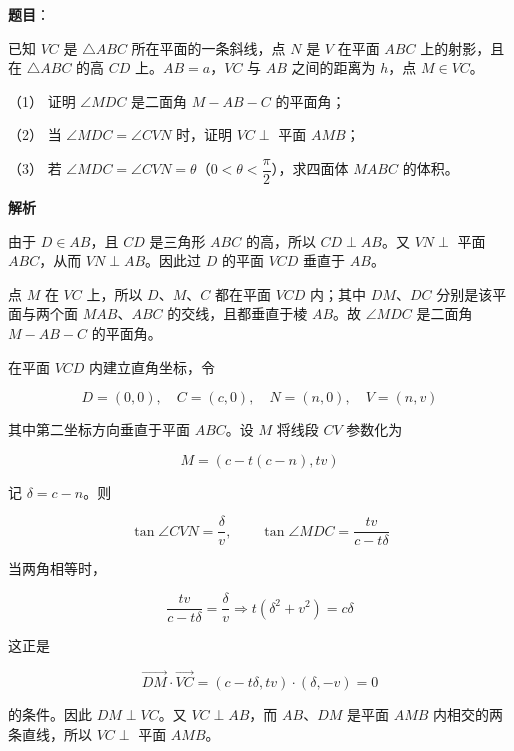 \begin{answer}

\textbf{题目}：

已知 $V C$ 是 $\triangle ABC$ 所在平面的一条斜线，点 $N$ 是 $V$ 在平面 $ABC$ 上的射影，且在 $\triangle ABC$ 的高 $CD$ 上。$AB=a$，$VC$ 与 $AB$ 之间的距离为 $h$，点 $M\in VC$。
\nopagebreak[4]
\begin{center}\end{center}
\nopagebreak[4]
（1） 证明 $\angle MDC$ 是二面角 $M-AB-C$ 的平面角；

（2） 当 $\angle MDC=\angle CVN$ 时，证明 $VC\perp$ 平面 $AMB$；

（3） 若 $\angle MDC=\angle CVN=\theta$（$0<\theta<\dfrac\pi2$），求四面体 $MABC$ 的体积。

\textbf{解析}


由于 $D\in AB$，且 $CD$ 是三角形 $ABC$ 的高，所以 $CD\perp AB$。又 $VN\perp$ 平面 $ABC$，从而 $VN\perp AB$。因此过 $D$ 的平面 $VCD$ 垂直于 $AB$。

点 $M$ 在 $VC$ 上，所以 $D\text{、}M\text{、}C$ 都在平面 $VCD$ 内；其中 $DM$、$DC$ 分别是该平面与两个面 $MAB$、$ABC$ 的交线，且都垂直于棱 $AB$。故 $\angle MDC$ 是二面角 $M-AB-C$ 的平面角。


在平面 $VCD$ 内建立直角坐标，令

\nopagebreak[4]
\[
D=(0,0),\quad C=(c,0),\quad N=(n,0),\quad V=(n,v)
\]

其中第二坐标方向垂直于平面 $ABC$。设 $M$ 将线段 $CV$ 参数化为

\nopagebreak[4]
\[
M=(c-t(c-n),tv)
\]

记 $\delta=c-n$。则

\nopagebreak[4]
\[
\tan\angle CVN=\frac{\delta}{v},\qquad
\tan\angle MDC=\frac{tv}{c-t\delta}
\]

当两角相等时，

\nopagebreak[4]
\[
\frac{tv}{c-t\delta}=\frac{\delta}{v}
\Longrightarrow
t(\delta^2+v^2)=c\delta
\]

这正是

\nopagebreak[4]
\[
\overrightarrow{DM}\cdot\overrightarrow{VC}
=(c-t\delta,tv)\cdot(\delta,-v)=0
\]

的条件。因此 $DM\perp VC$。又 $VC\perp AB$，而 $AB$、$DM$ 是平面 $AMB$ 内相交的两条直线，所以 $VC\perp$ 平面 $AMB$。


\end{answer}

